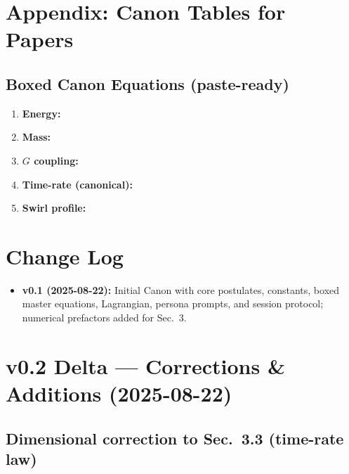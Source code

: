 \documentclass[11pt, a4paper]{article}
\begin{document}
\section{Appendix: Canon Tables for Papers}


\subsection*{Boxed Canon Equations (paste-ready)}

\begin{enumerate}
    \item \textbf{Energy:} 
    \item \textbf{Mass:} 
    \item \textbf{$G$ coupling:} 
    \item \textbf{Time-rate (canonical):} 
    \item \textbf{Swirl profile:} 
\end{enumerate}

\section{ Change Log}

\begin{itemize}
    \item \textbf{v0.1 (2025-08-22):} Initial Canon with core postulates, constants, boxed master equations, Lagrangian, persona prompts, and session protocol; numerical prefactors added for Sec.~3.
\end{itemize}

\section{v0.2 Delta --- Corrections \& Additions (2025-08-22)}

\subsection*{ Dimensional correction to Sec.~3.3 (time-rate law)}
\end{document}
